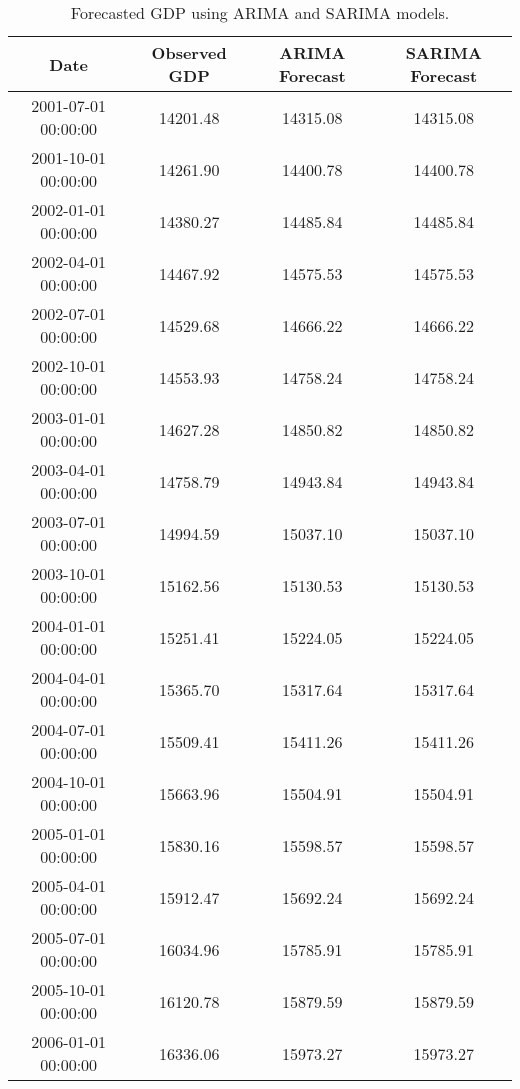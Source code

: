 \begin{table}[H]
    \centering
    \caption{Forecasted GDP using ARIMA and SARIMA models.}
    \label{tab:gdp_forecast}
    \begin{tabular}{|c|c|c|c|}
        \hline
        Date                & Observed GDP & ARIMA Forecast & SARIMA Forecast \\
        \hline
        2001-07-01 00:00:00 & 14201.48     & 14315.08       & 14315.08        \\
        2001-10-01 00:00:00 & 14261.90     & 14400.78       & 14400.78        \\
        2002-01-01 00:00:00 & 14380.27     & 14485.84       & 14485.84        \\
        2002-04-01 00:00:00 & 14467.92     & 14575.53       & 14575.53        \\
        2002-07-01 00:00:00 & 14529.68     & 14666.22       & 14666.22        \\
        2002-10-01 00:00:00 & 14553.93     & 14758.24       & 14758.24        \\
        2003-01-01 00:00:00 & 14627.28     & 14850.82       & 14850.82        \\
        2003-04-01 00:00:00 & 14758.79     & 14943.84       & 14943.84        \\
        2003-07-01 00:00:00 & 14994.59     & 15037.10       & 15037.10        \\
        2003-10-01 00:00:00 & 15162.56     & 15130.53       & 15130.53        \\
        2004-01-01 00:00:00 & 15251.41     & 15224.05       & 15224.05        \\
        2004-04-01 00:00:00 & 15365.70     & 15317.64       & 15317.64        \\
        2004-07-01 00:00:00 & 15509.41     & 15411.26       & 15411.26        \\
        2004-10-01 00:00:00 & 15663.96     & 15504.91       & 15504.91        \\
        2005-01-01 00:00:00 & 15830.16     & 15598.57       & 15598.57        \\
        2005-04-01 00:00:00 & 15912.47     & 15692.24       & 15692.24        \\
        2005-07-01 00:00:00 & 16034.96     & 15785.91       & 15785.91        \\
        2005-10-01 00:00:00 & 16120.78     & 15879.59       & 15879.59        \\
        2006-01-01 00:00:00 & 16336.06     & 15973.27       & 15973.27        \\

\end{tabular}
\end{table}
